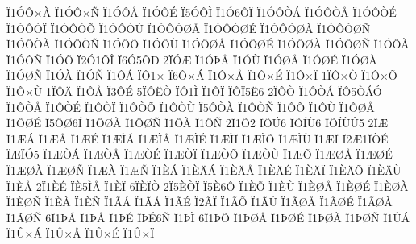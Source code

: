 {^^cf1^^d3^^d4^^d7^^c0
^^cf1^^d3^^d4^^d7^^d1
^^cf1^^d3^^d4^^c5
^^cf1^^d3^^d4^^c9
^^cf5^^d3^^d4^^cc
^^cf1^^d36^^d4^^cf
^^cf1^^d3^^d4^^d2^^c1
^^cf1^^d3^^d4^^d2^^c5
^^cf1^^d3^^d4^^d2^^c9
^^cf1^^d3^^d4^^d2^^cf
^^cf1^^d3^^d4^^d2^^d5
^^cf1^^d3^^d4^^d2^^d9
^^cf1^^d3^^d4^^d2^^d8^^c5
^^cf1^^d3^^d4^^d2^^d8^^c9
^^cf1^^d3^^d4^^d2^^d8^^c0
^^cf1^^d3^^d4^^d2^^d8^^d1
^^cf1^^d3^^d4^^d2^^c0
^^cf1^^d3^^d4^^d2^^d1
^^cf1^^d3^^d4^^d5
^^cf1^^d3^^d4^^d9
^^cf1^^d3^^d4^^d8^^c5
^^cf1^^d3^^d4^^d8^^c9
^^cf1^^d3^^d4^^d8^^c0
^^cf1^^d3^^d4^^d8^^d1
^^cf1^^d3^^d4^^c0
^^cf1^^d3^^d4^^d1
^^cf1^^d3^^d5
^^cf2^^d31^^d5^^ce
^^cf6^^d35^^d5^^d0
2^^cf^^d3^^c6
^^cf1^^d3^^de^^c5
^^cf1^^d3^^d9
^^cf1^^d3^^d8^^c5
^^cf1^^d3^^d8^^c9
^^cf1^^d3^^d8^^c0
^^cf1^^d3^^d8^^d1
^^cf1^^d3^^c0
^^cf1^^d3^^d1
^^cf1^^d4^^c1
^^cf^^d41^^d7
^^cf6^^d4^^d7^^c1
^^cf1^^d4^^d7^^c5
^^cf1^^d4^^d7^^c9
^^cf1^^d4^^d7^^cf
1^^cf^^d4^^d7^^d2
^^cf1^^d4^^d7^^d5
^^cf1^^d4^^d7^^d9
1^^cf^^d4^^c4
^^cf1^^d4^^c5
^^cf3^^d4^^c9
5^^cf^^d4^^cb^^d2
^^cf^^d41^^cc
^^cf1^^d4^^cf
^^cf^^d4^^cf5^^cb6
2^^cf^^d4^^d2
^^cf1^^d4^^d2^^c1
^^cf^^d45^^d2^^c1^^d3
^^cf1^^d4^^d2^^c5
^^cf1^^d4^^d2^^c9
^^cf1^^d4^^d2^^cf
^^cf1^^d4^^d2^^d5
^^cf1^^d4^^d2^^d9
^^cf5^^d4^^d2^^c0
^^cf1^^d4^^d2^^d1
^^cf1^^d4^^d5
^^cf1^^d4^^d9
^^cf1^^d4^^d8^^c5
^^cf1^^d4^^d8^^c9
^^cf5^^d4^^d86^^cd
^^cf1^^d4^^d8^^c0
^^cf1^^d4^^d8^^d1
^^cf1^^d4^^c0
^^cf1^^d4^^d1
2^^cf1^^d52
^^cf^^d5^^da6
^^cf^^d5^^cd^^d96
^^cf^^d5^^cd^^d9^^db5
2^^cf^^c6
^^cf1^^c6^^c1
^^cf1^^c6^^c5
^^cf1^^c6^^c9
^^cf1^^c6^^cc^^c1
^^cf1^^c6^^cc^^c5
^^cf1^^c6^^cc^^c9
^^cf1^^c6^^cc^^cf
^^cf1^^c6^^cc^^d5
^^cf1^^c6^^cc^^d9
^^cf1^^c6^^cf
^^cf2^^c61^^cf^^d2^^c9
^^cf^^c6^^cf^^d35
^^cf1^^c6^^d2^^c1
^^cf1^^c6^^d2^^c5
^^cf1^^c6^^d2^^c9
^^cf1^^c6^^d2^^cf
^^cf1^^c6^^d2^^d5
^^cf1^^c6^^d2^^d9
^^cf1^^c6^^d5
^^cf1^^c6^^d8^^c5
^^cf1^^c6^^d8^^c9
^^cf1^^c6^^d8^^c0
^^cf1^^c6^^d8^^d1
^^cf1^^c6^^c0
^^cf1^^c6^^d1
^^cf1^^c8^^c1
^^cf1^^c8^^c4^^c1
^^cf1^^c8^^c4^^c5
^^cf1^^c8^^c4^^c9
^^cf1^^c8^^c4^^cf
^^cf1^^c8^^c4^^d5
^^cf1^^c8^^c4^^d9
^^cf1^^c8^^c5
2^^cf1^^c8^^c9
^^cf^^c85^^cc^^c5
^^cf1^^c8^^cf
6^^cf^^c8^^cf^^d2
2^^cf5^^c8^^d2^^cf
^^cf5^^c86^^d4
^^cf1^^c8^^d5
^^cf1^^c8^^d9
^^cf1^^c8^^d8^^c5
^^cf1^^c8^^d8^^c9
^^cf1^^c8^^d8^^c0
^^cf1^^c8^^d8^^d1
^^cf1^^c8^^c0
^^cf1^^c8^^d1
^^cf1^^c3^^c1
^^cf1^^c3^^c5
^^cf1^^c3^^c9
^^cf2^^c3^^cf
^^cf1^^c3^^d5
^^cf1^^c3^^d9
^^cf1^^c3^^d8^^c5
^^cf1^^c3^^d8^^c9
^^cf1^^c3^^d8^^c0
^^cf1^^c3^^d8^^d1
6^^cf1^^de^^c1
^^cf1^^de^^c5
^^cf1^^de^^c9
^^cf^^de^^c96^^d1
^^cf1^^de^^cc
6^^cf1^^de^^d5
^^cf1^^de^^d8^^c5
^^cf1^^de^^d8^^c9
^^cf1^^de^^d8^^c0
^^cf1^^de^^d8^^d1
^^cf1^^db^^c1
^^cf1^^db^^d7^^c1
^^cf1^^db^^d7^^c5
^^cf1^^db^^d7^^c9
^^cf1^^db^^d7^^cf
}
